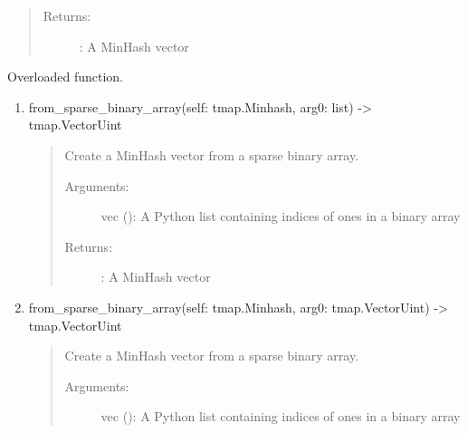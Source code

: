 \documentclass[letterpaper,10pt,english]{sphinxmanual}
\begin{document}
\begin{fulllineitems}
\begin{fulllineitems}
\begin{enumerate}
\begin{quote}
\begin{description}
\item[{Returns:}] \leavevmode
{}: A MinHash vector

\end{description}
\end{quote}

\end{enumerate}

\end{fulllineitems}


\begin{fulllineitems}
\label{\detokenize{documentation:tmap.Minhash.from_sparse_binary_array}}
Overloaded function.
\begin{enumerate}
\def\theenumi{\arabic{enumi}}
\def\labelenumi{\theenumi .}
\makeatletter\def\p@enumii{\p@enumi \theenumi .}\makeatother
\item {} 
from\_sparse\_binary\_array(self: tmap.Minhash, arg0: list) -\textgreater{} tmap.VectorUint
\begin{quote}

Create a MinHash vector from a sparse binary array.
\begin{description}
\item[{Arguments:}] \leavevmode
vec (): A Python list containing indices of ones in a binary array

\item[{Returns:}] \leavevmode
{}: A MinHash vector

\end{description}
\end{quote}

\item {} 
from\_sparse\_binary\_array(self: tmap.Minhash, arg0: tmap.VectorUint) -\textgreater{} tmap.VectorUint
\begin{quote}

Create a MinHash vector from a sparse binary array.
\begin{description}
\item[{Arguments:}] \leavevmode
vec (): A Python list containing indices of ones in a binary array


\end{description}
\end{quote}
\end{enumerate}
\end{fulllineitems}
\end{fulllineitems}
\end{document}
